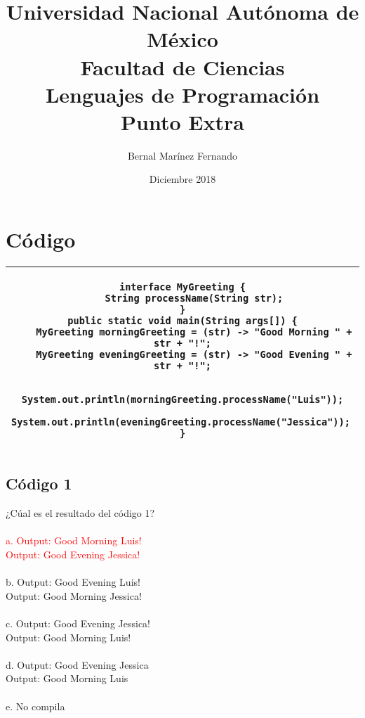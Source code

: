 \documentclass[spanish,english]{article}
\title{Universidad Nacional Autónoma de México\\
Facultad de Ciencias \\
Lenguajes de Programación \\
Punto Extra}
\author{Bernal Mar\'inez Fernando}
\date{Diciembre 2018}
\begin{document}
\maketitle

\section{Código}

\item[\hspace*{1cm} \hspace*{1cm}
\hspace*{1cm} \hspace*{1cm}]
\begin{tabular}{|c|}
\hline 
\begin{lstlisting}
interface MyGreeting {
	String processName(String str);
}
public static void main(String args[]) {
	MyGreeting morningGreeting = (str) -> "Good Morning " + str + "!";
	MyGreeting eveningGreeting = (str) -> "Good Evening " + str + "!";
  
	System.out.println(morningGreeting.processName("Luis"));
	System.out.println(eveningGreeting.processName("Jessica"));	
}
\end{lstlisting}
\hspace*{1cm} \hspace*{1cm} \hspace*{1cm} \hspace*{1cm} \tabularnewline
\hline 
\end{tabular}

\subsection{Código 1}

¿Cúal es el resultado del código 1?\\\\

\textcolor{red}{a.  Output: Good Morning Luis! \\
	Output: Good Evening Jessica!}\\\\ 
b. Output: Good Evening Luis! \\
	Output: Good Morning Jessica!\\\\
c. Output: Good Evening Jessica!\\ 
	Output: Good Morning Luis!\\\\
d. Output: Good Evening Jessica\\
	Output: Good Morning Luis\\\\
e. No compila\\
\end{document}
